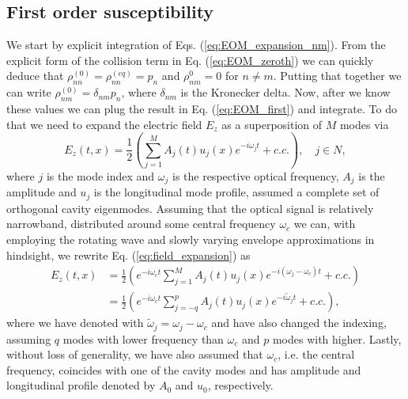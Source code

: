 \documentclass[journal]{IEEEtran}
\begin{document}
\subsection{First order susceptibility}
We start by explicit integration of Eqs. (\ref{eq:EOM_expansion_nm}). From the explicit form of the collision term in Eq. (\ref{eq:EOM_zeroth}) we can quickly deduce that $\rho_{nn}^{(0)} = \rho_{nn}^{(eq)} = p_n$ and $\rho_{nm}^{0} = 0$ for $n\neq m$. Putting that together we can write $\rho_{nm}^{(0)} = \delta_{nm}p_n $, where $\delta_{nm}$ is the Kronecker delta. Now, after we know these values we can plug the result in Eq. (\ref{eq:EOM_first}) and integrate. To do that we need to expand the electric field $E_z$ as a superposition of $M$ modes via
\begin{equation}
\label{eq:field_expansion}
E_z(t,x) = \frac{1}{2}(\sum_{j=1}^{M} A_j(t)u_j(x) e^{-i\omega_j t } + c.c.), \quad j \in N,
\end{equation}
where $j$ is the mode index and $\omega_j$  is the respective optical frequency, $A_j$ is the amplitude and $u_j$ is the longitudinal mode profile, assumed a complete set of orthogonal cavity eigenmodes. Assuming that the optical signal is relatively narrowband, distributed around some central frequency $\omega_c$ we can, with employing the rotating wave and slowly varying envelope approximations in hindsight, we rewrite Eq. (\ref{eq:field_expansion}) as 
\begin{align}
\label{eq:field_expansion_rwa}
E_z(t,x) &= \frac{1}{2}(e^{-i\omega_c t}\sum_{j=1}^{M} A_j(t)u_j(x) e^{-i(\omega_j-\omega_c) t } + c.c.) \nonumber \\
		&= \frac{1}{2}(e^{-i\omega_c t}\sum_{j=-q}^{p} A_j(t)u_j(x) e^{-i\tilde\omega_j t } + c.c.), 
\end{align}
where we have denoted with $\tilde \omega_j = \omega_j-\omega_c$ and have also changed the indexing, assuming $q$ modes with lower frequency than $\omega_c$ and $p$ modes with higher. Lastly, without loss of generality, we have also assumed that $\omega_c$, i.e. the central frequency, coincides with one of the cavity modes and has amplitude and longitudinal profile denoted by $A_0$ and $u_0$, respectively.   
\end{document}
